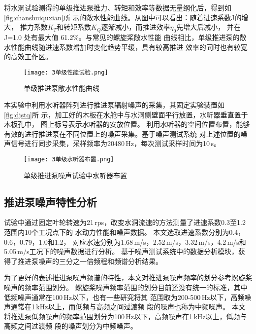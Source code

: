将水洞试验测得的单级推进泵推力、转矩和效率等数据无量纲化后，得到如\autoref{fig:chanshuiquxian}所
示的敞水性能曲线。从图中可以看出：随着进速系数J的增大，
推力系数$K_T$和转矩系数$K_Q$逐渐减小，而推进效率$\eta_0$先增大后减小，
并在 J=1.0 处有最大值 61.2\%。与常见的螺旋桨敞水性能
曲线相比，单级推进泵的敞水性能曲线随进速系数增加时变化趋势平缓，具有较高推进
效率的同时也有较宽的高效工作区。
\begin{figure}[htbp]
    \centering
    \texttt{[image: 3单级性能试验.png]}
    \caption{\label{fig:chanshuiquxian}单级推进泵敞水性能曲线}
\end{figure}

本实验中利用水听器阵列进行推进泵辐射噪声的采集，其固定实验装置如\autoref{fig:djstq}所
示，加工好的木板在水舱中与水洞侧壁面平行放置，水听器垂直置于木板孔中，
图上标号表示水听器的安放位置。
利用水听器的空间位置布置，能够有效的进行推进泵在不同位置上的噪声采集。基于噪声测试系统
对上述位置的噪声信号进行同步采集，采样频率为20480\,Hz，每次测试采样时间为10\,s。
\begin{figure}[htbp]
    \centering
    \texttt{[image: 3单级水听器布置.png]}
    \caption{\label{fig:djstq}单级推进泵噪声试验中水听器布置}
\end{figure}
\subsection{推进泵噪声特性分析}
试验中通过固定叶轮转速为21\,rps，改变水洞流速的方法测量了进速系数0.3至1.2范围内10个工况点下的
水动力性能和噪声数据。
本文选取进速系数分别为0.4，0.6，0.79，1.0和1.2，
对应水速分别为1.68\,m/s，2.52\,m/s，3.32\,m/s，4.2\,m/s和5.05\,m/s工况下的噪声数据进行分析。
基于噪声测试系统中的数据分析模块，获得了推进泵噪声的三分之一倍频程和频谱分析结果。

为了更好的表述推进泵噪声频谱的特性，本文对推进泵噪声频率的划分参考螺旋桨噪声的频率范围划分。
螺旋桨噪声频率范围的划分目前还没有统一的标准，其中
低频噪声通常在100\,Hz以下，也有一些研究将其
范围取为200-500\,Hz以下，高频噪声通常在1\,kHz以上，而低频与高频之间过渡频
段的噪声也称为中频噪声\cite{xuye2019a}。
本文将推进泵低频噪声的频率范围划分为100\,Hz以下，高频噪声在1\,kHz以上，低频与高频之间过渡频
段的噪声划分为中频噪声。
